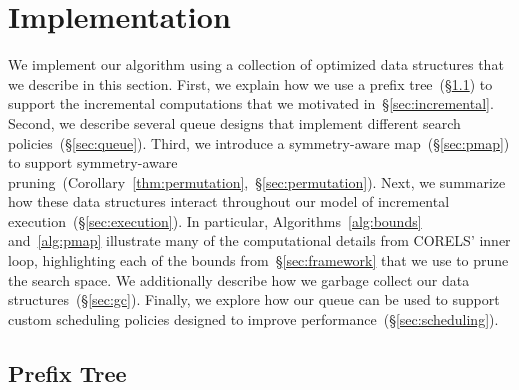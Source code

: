 

\clearpage
\section{Implementation}
\label{sec:implementation}

We implement our algorithm using a collection of optimized data structures
that we describe in this section.
%
First, we explain how we use a prefix tree~(\S\ref{sec:trie})
to support the incremental computations that we motivated in~\S\ref{sec:incremental}.
%
Second, we describe several queue designs
that implement different search policies~(\S\ref{sec:queue}).
%
Third, we introduce a symmetry-aware map~(\S\ref{sec:pmap}) to support
symmetry-aware pruning~(Corollary~\ref{thm:permutation},~\S\ref{sec:permutation}).
%
Next, we summarize how these data structures interact throughout
our model of incremental execution~(\S\ref{sec:execution}).
%
In particular, Algorithms~\ref{alg:bounds} and~\ref{alg:pmap} illustrate many
of the computational details from CORELS' inner loop, highlighting each of
the bounds from~\S\ref{sec:framework} that we use to prune the search space.
%
We additionally describe how we garbage collect our data structures~(\S\ref{sec:gc}).
%
Finally, we explore how our queue can be used to support
custom scheduling policies designed to improve performance~(\S\ref{sec:scheduling}).

\subsection{Prefix Tree}
\label{sec:trie}

